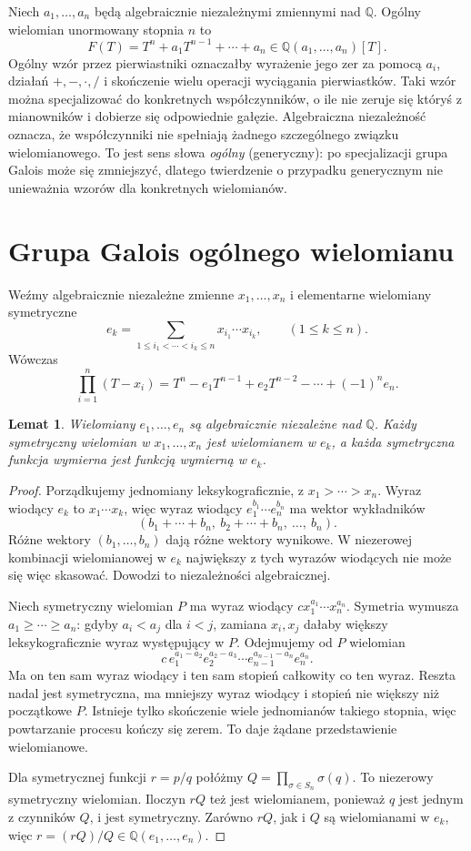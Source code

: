 \documentclass[11pt,a4paper,oneside]{book}
\numberwithin{equation}{section}
\theoremstyle{plain}
\newtheorem{lemat}[twierdzenie]{Lemat}
\theoremstyle{definition}
\theoremstyle{remark}
\newcommand{\Q}{\mathbb{Q}}
\begin{document}
Niech $a_1,\dots,a_n$ będą algebraicznie niezależnymi zmiennymi nad $\Q$. Ogólny wielomian unormowany stopnia $n$ to
\[
F(T)=T^n+a_1T^{n-1}+\cdots+a_n\in\Q(a_1,\dots,a_n)[T].
\]
Ogólny wzór przez pierwiastniki oznaczałby wyrażenie jego zer za pomocą $a_i$, działań $+,-,\cdot,/$ i skończenie wielu operacji wyciągania pierwiastków. Taki wzór można specjalizować do konkretnych współczynników, o ile nie zeruje się któryś z mianowników i dobierze się odpowiednie gałęzie. Algebraiczna niezależność oznacza, że współczynniki nie spełniają żadnego szczególnego związku wielomianowego. To jest sens słowa \emph{ogólny} (generyczny): po specjalizacji grupa Galois może się zmniejszyć, dlatego twierdzenie o przypadku generycznym nie unieważnia wzorów dla konkretnych wielomianów.

\section{Grupa Galois ogólnego wielomianu}

Weźmy algebraicznie niezależne zmienne $x_1,\dots,x_n$ i elementarne wielomiany symetryczne
\[
e_k=\sum_{1\le i_1<\cdots<i_k\le n}x_{i_1}\cdots x_{i_k},\qquad(1\le k\le n).
\]
Wówczas
\[
\prod_{i=1}^n(T-x_i)=T^n-e_1T^{n-1}+e_2T^{n-2}-\cdots+(-1)^ne_n.
\]

\begin{lemat}
Wielomiany $e_1,\dots,e_n$ są algebraicznie niezależne nad $\Q$. Każdy symetryczny wielomian w $x_1,\dots,x_n$ jest wielomianem w $e_k$, a każda symetryczna funkcja wymierna jest funkcją wymierną w $e_k$.
\end{lemat}
\begin{proof}
Porządkujemy jednomiany leksykograficznie, z $x_1>\cdots>x_n$. Wyraz wiodący $e_k$ to $x_1\cdots x_k$, więc wyraz wiodący $e_1^{b_1}\cdots e_n^{b_n}$ ma wektor wykładników
\[
(b_1+\cdots+b_n,\ b_2+\cdots+b_n,\ \dots,\ b_n).
\]
Różne wektory $(b_1,\dots,b_n)$ dają różne wektory wynikowe. W niezerowej kombinacji wielomianowej w $e_k$ największy z tych wyrazów wiodących nie może się więc skasować. Dowodzi to niezależności algebraicznej.

Niech symetryczny wielomian $P$ ma wyraz wiodący $c x_1^{a_1}\cdots x_n^{a_n}$. Symetria wymusza $a_1\ge\cdots\ge a_n$: gdyby $a_i<a_j$ dla $i<j$, zamiana $x_i,x_j$ dałaby większy leksykograficznie wyraz występujący w $P$. Odejmujemy od $P$ wielomian
\[
c\,e_1^{a_1-a_2}e_2^{a_2-a_3}\cdots e_{n-1}^{a_{n-1}-a_n}e_n^{a_n}.
\]
Ma on ten sam wyraz wiodący i ten sam stopień całkowity co ten wyraz. Reszta nadal jest symetryczna, ma mniejszy wyraz wiodący i stopień nie większy niż początkowe $P$. Istnieje tylko skończenie wiele jednomianów takiego stopnia, więc powtarzanie procesu kończy się zerem. To daje żądane przedstawienie wielomianowe.

Dla symetrycznej funkcji $r=p/q$ połóżmy $Q=\prod_{\sigma\in S_n}\sigma(q)$. To niezerowy symetryczny wielomian. Iloczyn $rQ$ też jest wielomianem, ponieważ $q$ jest jednym z czynników $Q$, i jest symetryczny. Zarówno $rQ$, jak i $Q$ są wielomianami w $e_k$, więc $r=(rQ)/Q\in\Q(e_1,\dots,e_n)$.
\end{proof}
\end{document}
